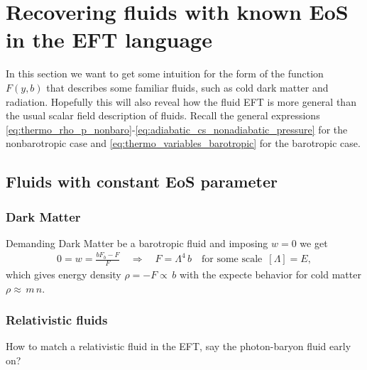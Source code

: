 \section{Recovering fluids with known EoS in the EFT language}

In this section we want to get some intuition for the form of the function $F(y,b)$ that describes some familiar fluids, such as cold dark matter and radiation.
Hopefully this will also reveal how the fluid EFT is more general than the usual scalar field description of fluids.
Recall the general expressions \eqref{eq:thermo_rho_p_nonbaro}-\eqref{eq:adiabatic_cs_nonadiabatic_pressure} for the nonbarotropic case and \eqref{eq:thermo_variables_barotropic} for the barotropic case.

\subsection{Fluids with constant EoS parameter}

\subsubsection{Dark Matter}
%
Demanding Dark Matter be a barotropic fluid and imposing $w=0$ we get
\begin{align}
    0= w=\frac{bF_b-F}{F}\quad \Rightarrow\quad F=\Lambda^4 \,b\quad \text{for some scale } \, [\Lambda]=E,
\end{align}
which gives energy density $\rho=-F\propto \, b$ with the expecte behavior for cold matter $\rho \approx \, m \, n$.


\subsubsection{Relativistic fluids}
How to match a relativistic fluid in the EFT, say the photon-baryon fluid early on?

